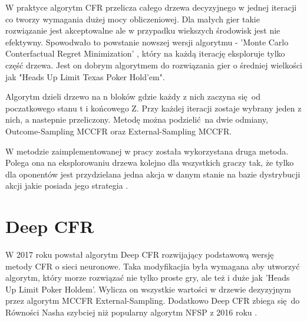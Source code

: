 \documentclass[12pt,oneside,a4paper]{report}
\begin{document}
W praktyce algorytm CFR przelicza całego drzewa decyzyjnego w jednej iteracji co tworzy wymagania
dużej mocy obliczeniowej. Dla małych gier takie rozwiązanie jest akceptowalne ale w przypadku 
wiekszych środowisk jest nie efektywny.
Spowodwało to powstanie nowszej wersji algorytmu - 'Monte Carlo Conterfactual Regret Minimization'
, który na każdą iterację eksploruje tylko część drzewa.
Jest on dobrym algorytmem do rozwiązania gier o średniej 
wielkości jak "Heads Up Limit Texas Poker Hold'em". 

Algorytm dzieli drzewo na n bloków gdzie każdy z nich zaczyna się od poczatkowego stanu t i
końcowego Z. Przy każdej iteracji zostaje wybrany jeden z nich, a nastepnie przeliczony. 
Metodę można podzielić na dwie odmiany, Outcome-Sampling MCCFR oraz External-Sampling MCCFR.

W metodzie zaimplementowanej w pracy została wykorzystana druga metoda. Polega ona na 
eksplorowaniu drzewa kolejno dla wszystkich graczy tak, że tylko dla oponentów jest przydzielana
jedna akcja w danym stanie na bazie dystrybucji akcji jakie posiada jego strategia \cite{mccfr}.



\chapter{Deep CFR}


W 2017 roku powstał algorytm Deep CFR rozwijający podstawową wersję metody CFR o sieci neuronowe.
Taka modyfikacjia była wymagana aby utworzyć algorytm, który morze rozwiązać nie tylko proste gry,
ale też i duże jak 'Heads Up Limit Poker Holdem'. Wylicza on wszystkie wartości w drzewie dezyzyjnym
przez algorytm MCCFR External-Sampling. Dodatkowo Deep CFR zbiega się do Równości Nasha szybciej niż 
popularny algorytm NFSP z 2016 roku \cite{dcfr}.


 
\end{document}
